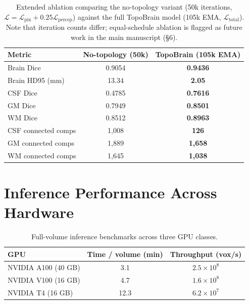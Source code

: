 \documentclass[10pt,a4paper]{article}
\begin{document}
\begin{table}[!ht]
\caption{Extended ablation comparing the no-topology variant (50k
iterations, $\mathcal{L}=\mathcal{L}_\text{pix}+0.25\mathcal{L}_\text{percep}$)
against the full TopoBrain model (105k EMA, $\mathcal{L}_\text{total}$).
Note that iteration counts differ; equal-schedule ablation is flagged
as future work in the main manuscript (\S6).}
\centering
\small
\begin{tabular}{lcc}
\toprule
Metric & No-topology (50k) & TopoBrain (105k EMA) \\
\midrule
Brain Dice              & 0.9054  & \textbf{0.9436} \\
Brain HD95 (mm)         & 13.34   & \textbf{2.05}   \\
CSF Dice                & 0.4785  & \textbf{0.7616} \\
GM Dice                 & 0.7949  & \textbf{0.8501} \\
WM Dice                 & 0.8512  & \textbf{0.8963} \\
CSF connected comps     & 1{,}008 & \textbf{126}    \\
GM connected comps      & 1{,}889 & \textbf{1{,}658} \\
WM connected comps      & 1{,}645 & \textbf{1{,}038} \\
\bottomrule
\end{tabular}
\end{table}

\section{Inference Performance Across Hardware}

\begin{table}[!ht]
\caption{Full-volume inference benchmarks across three GPU classes.}
\centering
\small
\begin{tabular}{lcc}
\toprule
GPU & Time / volume (min) & Throughput (vox/s) \\
\midrule
NVIDIA A100 (40 GB)   & 3.1   & $2.5\times10^8$ \\
NVIDIA V100 (16 GB)   & 4.7   & $1.6\times10^8$ \\
NVIDIA T4   (16 GB)   & 12.3  & $6.2\times10^7$ \\
\bottomrule
\end{tabular}
\end{table}
\end{document}
